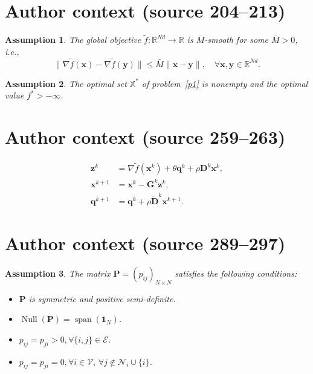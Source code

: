 \documentclass[10pt,a4paper]{amsart}
\newtheorem{assumption}{Assumption}
\renewcommand{\Re}{{\mathbb{R}}}
\providecommand{\bx}{{\mathbf{x}}}\providecommand{\bH}{{\mathbf{H}}}
\begin{document}
\section*{Author context (source 204--213)}

\begin{assumption}\label{assumption smooth}
The global objective $\tilde{f}:\Re^{Nd}\rightarrow\Re$ is $\bar{M}$-smooth for some $\bar{M}> 0$, i.e.,
\begin{equation}
\|\nabla \tilde{f}(\mathbf{x}) - \nabla \tilde{f}(\mathbf{y})\|\leq \bar{M}\|\mathbf{x}-\mathbf{y}\|,\quad\forall \mathbf{x},\mathbf{y}\in \Re^{Nd}.\label{smooth}
\end{equation}
\end{assumption}

\begin{assumption}\label{assumption: optimality}
The optimal set $\mathbb{X}^*$ of problem~\eqref{p1} is nonempty and the optimal value $f^* >-\infty$.
\end{assumption}


\section*{Author context (source 259--263)}

\begin{align}
    \label{zk final} \mathbf{z}^{k} &= \nabla \tilde{f}(\mathbf{x}^k) + \theta\mathbf{q}^k + \rho \mathbf{D}^k \mathbf{x}^k,\\
	\label{xk+1 final} \mathbf{x}^{k+1} &= \mathbf{x}^k - \mathbf{G}^k \mathbf{z}^k,\\ 
	\label{qk+1 final} \mathbf{q}^{k+1} &= \mathbf{q}^{k}+\rho \tilde{\mathbf{D}}^k\bx^{k+1}.
\end{align}


\section*{Author context (source 289--297)}

\begin{assumption}\label{assumption: distributed}
    The matrix $\mathbf{P}=(p_{ij})_{N\times N}$ satisfies the following conditions:
    \begin{itemize}
        \item[($\romannumeral1$)] $\mathbf{P}$ is symmetric and positive semi-definite.
        \item[($\romannumeral2$)] $\operatorname{Null}(\mathbf{P})=\operatorname{span}(\mathbf{1}_N)$.
        \item[($\romannumeral3$)] $p_{ij}=p_{ji}>0, \forall \{i,j\}\in \mathcal{E}$.
        \item[($\romannumeral4$)] $p_{ij}=p_{ji}=0, \forall i\in \mathcal{V},\,\forall j\notin \mathcal{N}_i\cup \{i\}$.
    \end{itemize}
\end{assumption}
\end{document}
